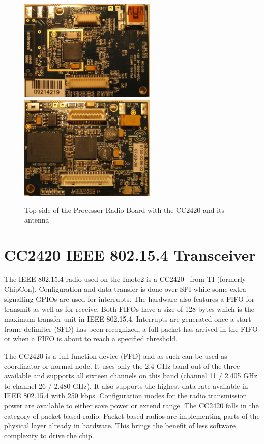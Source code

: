 \begin{figure}
  \begin{center}
    \includegraphics[width=6.5cm]{images/imote_top_cutted}
    \includegraphics[width=6.5cm]{images/imote_bottom_cutted}
    \caption{Top side of the Processor Radio Board with the CC2420 and its antenna}
        \label{fig:imote2top}
  \end{center}
\end{figure}

\section{CC2420 IEEE 802.15.4 Transceiver}
\label{cc2420}
The IEEE 802.15.4 radio used on the Imote2 is a CC2420~\cite{cc2420} from TI (formerly ChipCon).
Configuration and data transfer is done over SPI while some extra signalling
GPIOs are used for interrupts. The hardware also features a FIFO for transmit as
well as for receive. Both FIFOs have a size of 128 bytes which is the maximum
transfer unit in IEEE 802.15.4. Interrupts are generated once a start frame delimiter
(SFD) has been recognized, a full packet has arrived in the FIFO or when a FIFO is
about to reach a specified threshold.

The CC2420 is a full-function device (FFD) and as such can be used as
coordinator or normal node. It uses only the 2.4 GHz band out of the three
available and supports all sixteen channels on this band (channel 11 / 2.405 GHz
to channel 26 / 2.480 GHz). It also supports the highest data rate available
in IEEE 802.15.4 with 250 kbps. Configuration modes for the radio transmission power
are available to either save power or extend range. The CC2420 falls in the
category of packet-based radio. Packet-based radios are implementing parts of
the physical layer already in hardware. This brings the benefit of less software
complexity to drive the chip.

